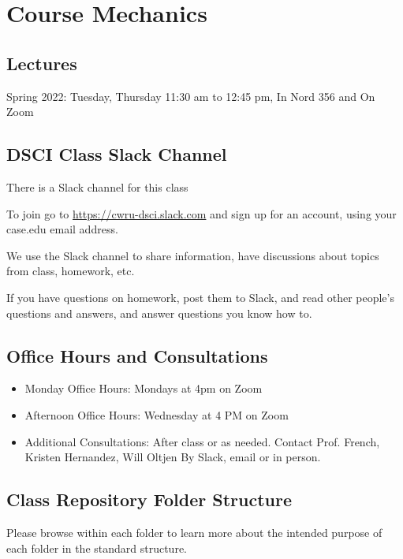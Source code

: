 \documentclass[10pt]{article} %
\begin{document}
\section{Course Mechanics}

  \subsection{Lectures}
    Spring 2022: Tuesday, Thursday 11:30 am to 12:45 pm, In Nord 356 and On Zoom

  \subsection{DSCI Class Slack Channel}

    There is a Slack channel for this class

    To join go to \href{"https://cwru-dsci.slack.com''}{https://cwru-dsci.slack.com} and sign up for an account, using your case.edu email address.

    We use the Slack channel to share information, have discussions about topics from class, homework, etc.

    If you have questions on homework, post them to Slack, and read other people's questions and answers, and answer questions you know how to.

  \subsection{Office Hours and Consultations}
    \begin{itemize}
      \item Monday Office Hours: Mondays at 4pm on Zoom
      \item Afternoon Office Hours: Wednesday at 4 PM on Zoom
      \item Additional Consultations: After class or as needed.
        \subitem Contact Prof. French, Kristen Hernandez, Will Oltjen
        \subitem By Slack, email or in person.
    \end{itemize}

  \subsection{Class Repository Folder Structure}

    Please browse within each folder to learn more about the intended purpose of each folder in the standard structure.
\end{document}
